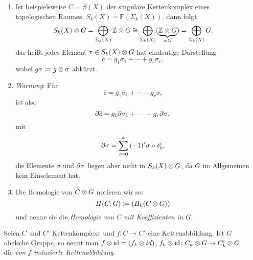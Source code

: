 
\begin{kommentar}
  \begin{enumerate}
    \item
      Ist beispielsweise $C = S(X)$ der singuläre Kettenkomplex eines topologischen Raumes, $S_k(X) = \mathbb{F} (\Sigma_k(X))$, dann folgt
      \begin{equation*}
        S_k(X) \otimes G = \bigoplus_{\Sigma_k(X)} \mathbb{Z} \otimes G \cong \bigoplus_{\Sigma_k(X)} (\underbrace{\mathbb{Z} \otimes G}_{=G}) = \bigoplus_{\Sigma_k(X)} G,
      \end{equation*}
      das heißt jedes Element $\tau \in S_k(X) \otimes G$ hat eindeutige Darstellung
      \begin{equation*}
        \overline c = g_1 \sigma_1 + \dotsb + g_r \sigma_r,
      \end{equation*}
      wobei $g \sigma \coloneqq g \otimes \sigma$ abkürzt.
    \item
      \emph{Warnung}: Für
      \begin{equation*}
        \overline c = g_1 \sigma_1 + \dotsb + g_r \sigma_r
      \end{equation*}
      ist also
      \begin{equation*}
        \partial \overline c = g_1 \partial \sigma_1 + \dotsb + g_r \partial \sigma_r
      \end{equation*}
      mit
      \begin{equation*}
        \partial \sigma = \sum_{i = 0}^k {(-1)}^{i} \sigma \circ \delta_k^i,
      \end{equation*}
      die Elemente $\sigma$ und $\partial \sigma$ liegen aber nicht in $S_k(X) \otimes G$, da $G$ im Allgemeinen kein Einselement hat.
    \item
      Die Homologie von $C \otimes G$ notieren wir so:
      \begin{equation*}
        H(C;G) \coloneqq (H_k(C \otimes G))
      \end{equation*}
      und nenne sie die \emph{Homologie von $C$ mit Koeffizienten in $G$}.
  \end{enumerate}
\end{kommentar}

\begin{defn}
  Seien $C$ und $C'$ Kettenkomplexe und $f \colon C \to C'$ eine Kettenabbildung.
  Ist $G$ abelsche Gruppe, so nennt man $f \otimes \operatorname{id} = (f_k \otimes id)$, $f_k \otimes \operatorname{id} \colon C_k \otimes G \to C_k' \otimes G$ die \emph{von $f$ induzierte Kettenabbildung}.
\end{defn}

